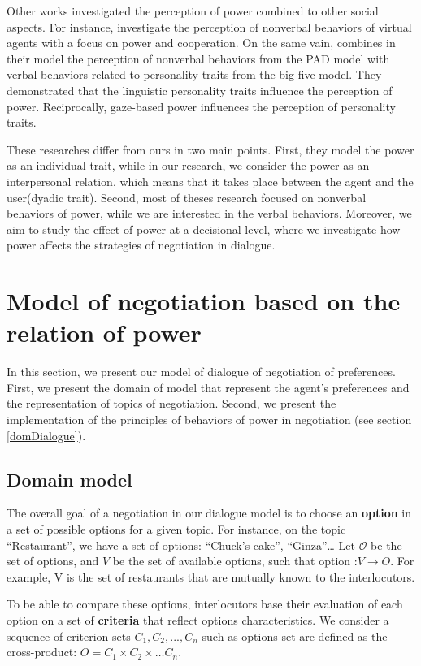 \documentclass{llncs}
\begin{document}
	\par Other works investigated the perception of power combined to other social aspects. For instance,\cite{strassmann2016effect} investigate the perception of nonverbal behaviors of virtual agents with a focus on power and cooperation. On the same vain,  \cite{bee2010bossy} combines in their model the perception of nonverbal behaviors from the PAD model \cite{mehrabian1996analysis} with verbal behaviors related to personality traits from the big five model.
	 They demonstrated that the linguistic personality traits influence the perception of power. Reciprocally, gaze-based power influences the perception of personality traits.
	
	 
	These researches differ from ours in two main points. First, they model the power as an individual trait, while in our research, we consider the power as an interpersonal relation, which means that it takes place between the agent and the user(dyadic trait). 
	Second, most of theses research focused on nonverbal behaviors of power, while we are interested in the verbal behaviors. Moreover, we aim to study the effect of power at a decisional level, where we investigate how power affects the strategies of negotiation in dialogue.
	
	
	\section{Model of negotiation based on the relation of power}
	In this section, we present our model of dialogue of negotiation of preferences.	
	First, we present the domain of model that represent the agent's preferences and the representation of topics of negotiation. Second, we present the implementation of the principles of behaviors of power in negotiation (see section \ref{domDialogue}).

	\subsection{Domain model}
	The overall goal of a negotiation in our dialogue model is to choose an \textbf{option} in a set of possible options for a given topic. For instance, on the topic ``Restaurant'', we have a set of options: ``Chuck's cake'', ``Ginza''\ldots 
	 Let $\mathcal{O}$ be the set of options, and $V$ be the set of available options, such that option :$ V\rightarrow O$. For example, V is the set of restaurants that are mutually known to the interlocutors. 
		
	\par To be able to compare these options, interlocutors base their evaluation of each option on a set of \textbf{criteria} that reflect options characteristics. We consider a sequence of criterion sets $C_1, C_2, ..., C_n$ such as options set are defined as the cross-product:
	$O = C_1 \times C_2 \times \ldots C_n$.
	
\end{document}
